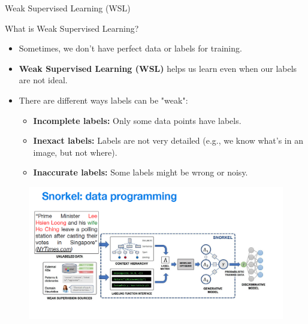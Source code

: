 \begin{frame}{}
    \LARGE Weak Supervised Learning (WSL)
\end{frame}

\begin{frame}[allowframebreaks]{}
    \begin{figure}
        \centering
    \end{figure}
\end{frame}

\begin{frame}[allowframebreaks]{What is Weak Supervised Learning?}
    \begin{itemize}
        \item Sometimes, we don't have perfect data or labels for training.
        \item \textbf{Weak Supervised Learning (WSL)} helps us learn even when our labels are not ideal.
        \item There are different ways labels can be "weak":
        \begin{itemize}
            \item \textbf{Incomplete labels:} Only some data points have labels.
            \item \textbf{Inexact labels:} Labels are not very detailed (e.g., we know what’s in an image, but not where).
            \item \textbf{Inaccurate labels:} Some labels might be wrong or noisy.
        \end{itemize}
    \end{itemize}

    \framebreak
    \begin{figure}
        \centering
        \includegraphics[width=1.05\linewidth,height=0.95\textheight,keepaspectratio]{images/contrastive/snorkel.png}
    \end{figure}


\end{frame}
